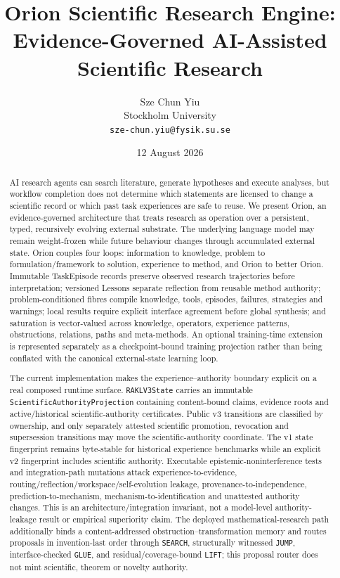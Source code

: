 \documentclass[11pt]{article}
\title{Orion Scientific Research Engine: Evidence-Governed AI-Assisted Scientific Research}
\author{Sze Chun Yiu\\Stockholm University\\\texttt{sze-chun.yiu@fysik.su.se}}
\date{12 August 2026}
\begin{document}
\maketitle

\begin{abstract}
AI research agents can search literature, generate hypotheses and execute analyses, but workflow completion does not determine which statements are licensed to change a scientific record or which past task experiences are safe to reuse. We present Orion, an evidence-governed architecture that treats research as operation over a persistent, typed, recursively evolving external substrate. The underlying language model may remain weight-frozen while future behaviour changes through accumulated external state. Orion couples four loops: information to knowledge, problem to formulation/framework to solution, experience to method, and Orion to better Orion. Immutable TaskEpisode records preserve observed research trajectories before interpretation; versioned Lessons separate reflection from reusable method authority; problem-conditioned fibres compile knowledge, tools, episodes, failures, strategies and warnings; local results require explicit interface agreement before global synthesis; and saturation is vector-valued across knowledge, operators, experience patterns, obstructions, relations, paths and meta-methods. An optional training-time extension is represented separately as a checkpoint-bound training projection rather than being conflated with the canonical external-state learning loop.

The current implementation makes the experience--authority boundary explicit on a real composed runtime surface. \texttt{RAKLV3State} carries an immutable \texttt{ScientificAuthorityProjection} containing content-bound claims, evidence roots and active/historical scientific-authority certificates. Public v3 transitions are classified by ownership, and only separately attested scientific promotion, revocation and supersession transitions may move the scientific-authority coordinate. The v1 state fingerprint remains byte-stable for historical experience benchmarks while an explicit v2 fingerprint includes scientific authority. Executable epistemic-noninterference tests and integration-path mutations attack experience-to-evidence, routing/reflection/workspace/self-evolution leakage, provenance-to-independence, prediction-to-mechanism, mechanism-to-identification and unattested authority changes. This is an architecture/integration invariant, not a model-level authority-leakage result or empirical superiority claim. The deployed mathematical-research path additionally binds a content-addressed obstruction--transformation memory and routes proposals in invention-last order through \texttt{SEARCH}, structurally witnessed \texttt{JUMP}, interface-checked \texttt{GLUE}, and residual/coverage-bound \texttt{LIFT}; this proposal router does not mint scientific, theorem or novelty authority.


\end{abstract}
\end{document}
